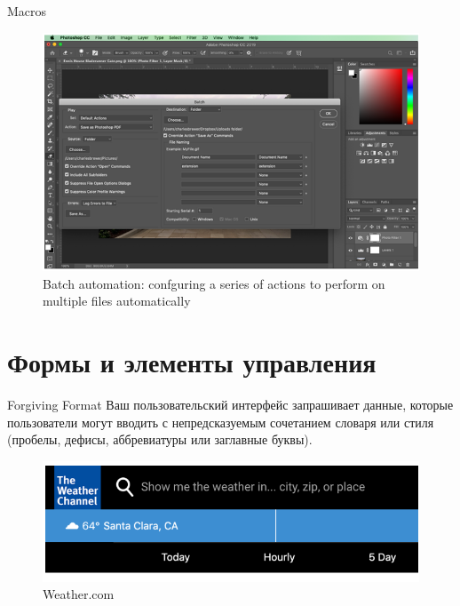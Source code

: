 \documentclass{beamer}
\begin{document}
\begin{frame}[t]{Macros}
	\begin{figure}[h]
		\centering
		\includegraphics[scale=0.5]{images/lec08-pic28.png}
		\caption{Batch automation: confguring a series of actions to perform on multiple files automatically}
	\end{figure}
\end{frame}

\section{Формы и элементы управления}


\begin{frame}[t]{Forgiving Format}
	Ваш пользовательский интерфейс запрашивает данные, которые пользователи могут вводить с непредсказуемым сочетанием словаря
или стиля (пробелы, дефисы, аббревиатуры или заглавные буквы).
	\begin{figure}[h]
		\centering
		\includegraphics[scale=0.6]{images/lec08-pic30.png}
		\caption{Weather.com}
	\end{figure}
\end{frame}
	
\end{document}
